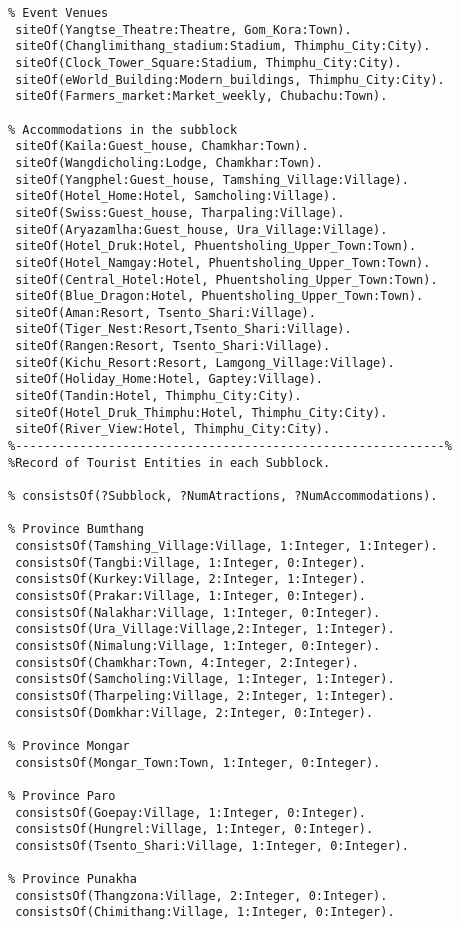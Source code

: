 \begin{verbatim}
% Event Venues
 siteOf(Yangtse_Theatre:Theatre, Gom_Kora:Town).
 siteOf(Changlimithang_stadium:Stadium, Thimphu_City:City).
 siteOf(Clock_Tower_Square:Stadium, Thimphu_City:City).
 siteOf(eWorld_Building:Modern_buildings, Thimphu_City:City).
 siteOf(Farmers_market:Market_weekly, Chubachu:Town).
 
% Accommodations in the subblock
 siteOf(Kaila:Guest_house, Chamkhar:Town).
 siteOf(Wangdicholing:Lodge, Chamkhar:Town).
 siteOf(Yangphel:Guest_house, Tamshing_Village:Village).
 siteOf(Hotel_Home:Hotel, Samcholing:Village).
 siteOf(Swiss:Guest_house, Tharpaling:Village).
 siteOf(Aryazamlha:Guest_house, Ura_Village:Village).
 siteOf(Hotel_Druk:Hotel, Phuentsholing_Upper_Town:Town).
 siteOf(Hotel_Namgay:Hotel, Phuentsholing_Upper_Town:Town).
 siteOf(Central_Hotel:Hotel, Phuentsholing_Upper_Town:Town).
 siteOf(Blue_Dragon:Hotel, Phuentsholing_Upper_Town:Town).
 siteOf(Aman:Resort, Tsento_Shari:Village).
 siteOf(Tiger_Nest:Resort,Tsento_Shari:Village).
 siteOf(Rangen:Resort, Tsento_Shari:Village).
 siteOf(Kichu_Resort:Resort, Lamgong_Village:Village).
 siteOf(Holiday_Home:Hotel, Gaptey:Village).
 siteOf(Tandin:Hotel, Thimphu_City:City).
 siteOf(Hotel_Druk_Thimphu:Hotel, Thimphu_City:City).
 siteOf(River_View:Hotel, Thimphu_City:City).
%------------------------------------------------------------%
%Record of Tourist Entities in each Subblock.

% consistsOf(?Subblock, ?NumAtractions, ?NumAccommodations).
		   
% Province Bumthang
 consistsOf(Tamshing_Village:Village, 1:Integer, 1:Integer).
 consistsOf(Tangbi:Village, 1:Integer, 0:Integer).
 consistsOf(Kurkey:Village, 2:Integer, 1:Integer).
 consistsOf(Prakar:Village, 1:Integer, 0:Integer).
 consistsOf(Nalakhar:Village, 1:Integer, 0:Integer).
 consistsOf(Ura_Village:Village,2:Integer, 1:Integer).
 consistsOf(Nimalung:Village, 1:Integer, 0:Integer).
 consistsOf(Chamkhar:Town, 4:Integer, 2:Integer).
 consistsOf(Samcholing:Village, 1:Integer, 1:Integer).
 consistsOf(Tharpeling:Village, 2:Integer, 1:Integer).
 consistsOf(Domkhar:Village, 2:Integer, 0:Integer).

% Province Mongar
 consistsOf(Mongar_Town:Town, 1:Integer, 0:Integer).

% Province Paro
 consistsOf(Goepay:Village, 1:Integer, 0:Integer).
 consistsOf(Hungrel:Village, 1:Integer, 0:Integer).
 consistsOf(Tsento_Shari:Village, 1:Integer, 0:Integer).

% Province Punakha
 consistsOf(Thangzona:Village, 2:Integer, 0:Integer).
 consistsOf(Chimithang:Village, 1:Integer, 0:Integer).


\end{verbatim}
